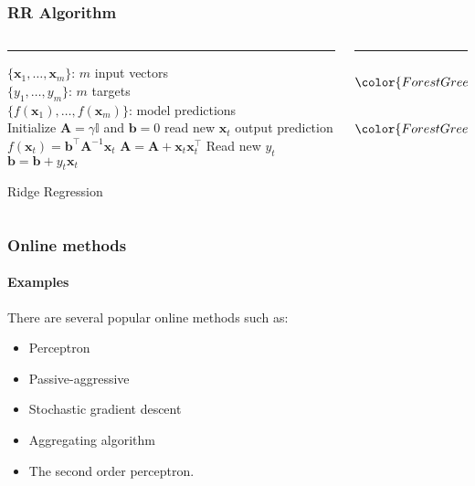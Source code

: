\begin{frame}
     \frametitle{RR Algorithm}

    \begin{columns}[T]
    \begin{column}{.6\textwidth}
    {\color{purple}\rule{\linewidth}{4pt}}
    \begin{algorithm}[H] \begin{algorithmic}[1] \REQUIRE $\,$ \\
    $\{\mathbf{x}_1,\dots,\mathbf{x}_m \}$: $m$ input vectors \\
    $\{y_1,\dots,y_m \}$: $m$ targets \\ \ENSURE  $\,$ \\
    $\{f(\mathbf{x}_1),\dots,f(\mathbf{x}_m) \}$: model predictions \\
    \STATE Initialize $\mathbf{A}=\gamma \mathbb{I}$ and $\mathbf{b}=0$
     \STATE read new $\mathbf{x}_t$ \STATE output
    prediction $f(\mathbf{x}_t) =  \mathbf{b}^\intercal
    \mathbf{A}^{-1}\mathbf{x}_t$ \STATE $\mathbf{A} = \mathbf{A} +
    \mathbf{x}_t \mathbf{x}_t^\intercal$ \STATE Read new $y_t$ \STATE
    $\mathbf{b} = \mathbf{b} + y_t \mathbf{x}_t$ \ENDFOR
    \end{algorithmic} \caption{Ridge Regression} \label{alg:RR}
    \end{algorithm}
    \end{column}
    \begin{column}{.3\textwidth}
    {\color{blue}\rule{\linewidth}{4pt}}
        \[ {\color{ForestGreen}\mathbf{b}}=  \sum_{t=1}^\intercal y_t \mathbf{x}_t  \]
    \[{\color{ForestGreen}\mathbf{A}}= \sum_{t=1}^\intercal \mathbf{x}_t \mathbf{x}_t
    ^\intercal + \gamma \mathbb{I} \]
    
    \end{column}
    \end{columns}
\end{frame}


\begin{frame}
    \frametitle{Online methods}
    \framesubtitle{Examples}
    There are several popular online methods such as:
    \begin{itemize}
    \item Perceptron
    \item Passive-aggressive
    \item Stochastic gradient descent
    \item {\color{red} Aggregating algorithm}
    \item The second order perceptron.
    \end{itemize}
\end{frame}


